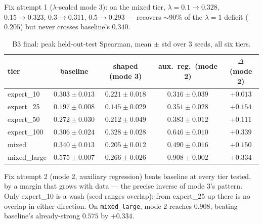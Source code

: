 \documentclass[11pt]{article}
\begin{document}
Fix attempt 1 ($\lambda$-scaled mode 3): on the mixed tier, $\lambda=0.1\to0.328$,
$0.15\to0.323$, $0.3\to0.311$, $0.5\to0.293$ --- recovers $\sim$90\% of the $\lambda=1$ deficit
($0.205$) but never crosses baseline's $0.340$.

\begin{table}[h]
\centering
\small
\caption{B3 final: peak held-out-test Spearman, mean $\pm$ std over 3 seeds, all six tiers.}
\begin{tabular}{lcccc}
\toprule
tier & baseline & shaped (mode 3) & \textbf{aux.\ reg.\ (mode 2)} & $\Delta$ (mode 2) \\
\midrule
expert\_10   & $0.303 \pm 0.013$ & $0.221 \pm 0.018$ & $0.316 \pm 0.039$ & $+0.013$ \\
expert\_25   & $0.197 \pm 0.008$ & $0.145 \pm 0.029$ & $\mathbf{0.351 \pm 0.028}$ & $\mathbf{+0.154}$ \\
expert\_50   & $0.272 \pm 0.030$ & $0.212 \pm 0.049$ & $\mathbf{0.383 \pm 0.012}$ & $\mathbf{+0.111}$ \\
expert\_100  & $0.306 \pm 0.024$ & $0.328 \pm 0.028$ & $\mathbf{0.646 \pm 0.010}$ & $\mathbf{+0.339}$ \\
mixed        & $0.340 \pm 0.013$ & $0.205 \pm 0.012$ & $\mathbf{0.490 \pm 0.016}$ & $\mathbf{+0.150}$ \\
mixed\_large & $0.575 \pm 0.007$ & $0.266 \pm 0.026$ & $\mathbf{0.908 \pm 0.002}$ & $\mathbf{+0.334}$ \\
\bottomrule
\end{tabular}
\end{table}

Fix attempt 2 (mode 2, auxiliary regression) beats baseline at every tier tested, by a margin
that grows with data --- the precise inverse of mode 3's pattern. Only expert\_10 is a wash (seed
ranges overlap); from expert\_25 up there is no overlap in either direction. On
\texttt{mixed\_large}, mode 2 reaches $0.908$, beating baseline's already-strong $0.575$ by
$+0.334$.
\end{document}
